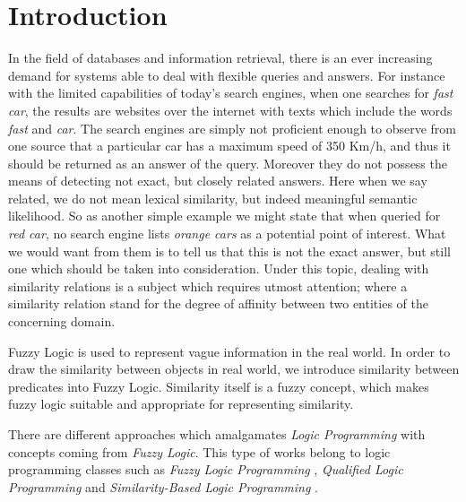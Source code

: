 \documentclass[egilmezThesis.tex]{subfiles}
\begin{document}
\chapter{Introduction}
\label{chap:Introduction}

In the field of databases and information retrieval, there is an ever increasing demand for systems able to deal with flexible queries and answers.  For instance  with the limited capabilities of today's search engines, when one searches for \textit{fast car}, the results are websites over the internet with texts which include the words \textit{fast} and \textit{car}. The search engines are simply not proficient enough to observe from one source that a particular car has a maximum speed of 350 Km/h, and thus it should be returned as an answer of the query. Moreover they do not possess the means of detecting not exact, but closely related answers. Here when we say related, we do not mean lexical similarity, but indeed meaningful semantic likelihood. So as another simple example we might state that when queried for \textit{red car}, no search engine lists \textit{orange cars} as a potential point of interest.  What we would want from them is to tell us that this is not the exact answer, but still one which should be taken into consideration. Under this topic, dealing with similarity relations is a subject which requires utmost attention; where a similarity relation stand for the degree of affinity between two entities of the concerning domain.

Fuzzy Logic is used to represent vague information in the real world. In order to draw the similarity between objects in real world, we introduce similarity between predicates into Fuzzy Logic. Similarity itself is a fuzzy concept, which makes fuzzy logic suitable and appropriate for representing similarity. 

There are different approaches which amalgamates \textit{Logic Programming} with concepts coming from \textit{Fuzzy Logic}. This type of works belong to logic programming classes such as \textit{Fuzzy Logic Programming} \cite{GMHV04}, \textit{Qualified Logic Programming} \cite{CRR08} and \textit{Similarity-Based Logic Programming} \cite{Ses02}.
\end{document}
